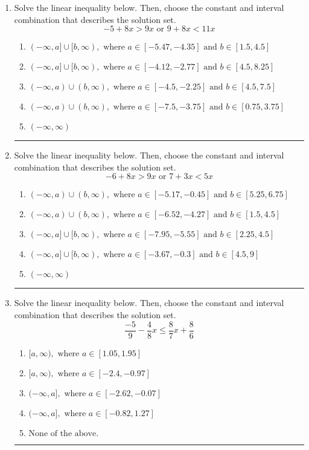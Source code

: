 \documentclass[14pt]{extbook}
\newcommand{\litem}[1]{\item#1\hspace*{-1cm}\rule{\textwidth}{0.4pt}}
\begin{document}
\begin{enumerate}
{\begin{enumerate}[label=\Alph*.]
\end{enumerate} }
\litem{
Solve the linear inequality below. Then, choose the constant and interval combination that describes the solution set.\[ -5 + 8 x > 9 x \text{ or } 9 + 8 x < 11 x \]\begin{enumerate}[label=\Alph*.]
\item \( (-\infty, a] \cup [b, \infty), \text{ where } a \in [-5.47, -4.35] \text{ and } b \in [1.5, 4.5] \)
\item \( (-\infty, a] \cup [b, \infty), \text{ where } a \in [-4.12, -2.77] \text{ and } b \in [4.5, 8.25] \)
\item \( (-\infty, a) \cup (b, \infty), \text{ where } a \in [-4.5, -2.25] \text{ and } b \in [4.5, 7.5] \)
\item \( (-\infty, a) \cup (b, \infty), \text{ where } a \in [-7.5, -3.75] \text{ and } b \in [0.75, 3.75] \)
\item \( (-\infty, \infty) \)

\end{enumerate} }
\litem{
Solve the linear inequality below. Then, choose the constant and interval combination that describes the solution set.\[ -6 + 8 x > 9 x \text{ or } 7 + 3 x < 5 x \]\begin{enumerate}[label=\Alph*.]
\item \( (-\infty, a) \cup (b, \infty), \text{ where } a \in [-5.17, -0.45] \text{ and } b \in [5.25, 6.75] \)
\item \( (-\infty, a) \cup (b, \infty), \text{ where } a \in [-6.52, -4.27] \text{ and } b \in [1.5, 4.5] \)
\item \( (-\infty, a] \cup [b, \infty), \text{ where } a \in [-7.95, -5.55] \text{ and } b \in [2.25, 4.5] \)
\item \( (-\infty, a] \cup [b, \infty), \text{ where } a \in [-3.67, -0.3] \text{ and } b \in [4.5, 9] \)
\item \( (-\infty, \infty) \)

\end{enumerate} }
\litem{
Solve the linear inequality below. Then, choose the constant and interval combination that describes the solution set.\[ \frac{-5}{9} - \frac{4}{8} x \leq \frac{8}{7} x + \frac{8}{6} \]\begin{enumerate}[label=\Alph*.]
\item \( [a, \infty), \text{ where } a \in [1.05, 1.95] \)
\item \( [a, \infty), \text{ where } a \in [-2.4, -0.97] \)
\item \( (-\infty, a], \text{ where } a \in [-2.62, -0.07] \)
\item \( (-\infty, a], \text{ where } a \in [-0.82, 1.27] \)
\item \( \text{None of the above}. \)


\end{enumerate}}
\end{enumerate}
\end{document}
